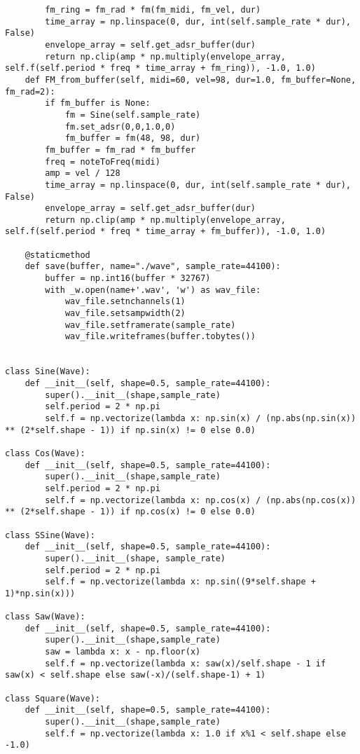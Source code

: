 \documentclass[../main.tex]{subfiles}
\begin{document}
\begin{verbatim}
        fm_ring = fm_rad * fm(fm_midi, fm_vel, dur)
        time_array = np.linspace(0, dur, int(self.sample_rate * dur), False)
        envelope_array = self.get_adsr_buffer(dur)
        return np.clip(amp * np.multiply(envelope_array, self.f(self.period * freq * time_array + fm_ring)), -1.0, 1.0)
    def FM_from_buffer(self, midi=60, vel=98, dur=1.0, fm_buffer=None, fm_rad=2):
        if fm_buffer is None:
            fm = Sine(self.sample_rate)
            fm.set_adsr(0,0,1.0,0)
            fm_buffer = fm(48, 98, dur)
        fm_buffer = fm_rad * fm_buffer
        freq = noteToFreq(midi)
        amp = vel / 128
        time_array = np.linspace(0, dur, int(self.sample_rate * dur), False)
        envelope_array = self.get_adsr_buffer(dur)
        return np.clip(amp * np.multiply(envelope_array, self.f(self.period * freq * time_array + fm_buffer)), -1.0, 1.0)

    @staticmethod
    def save(buffer, name="./wave", sample_rate=44100):
        buffer = np.int16(buffer * 32767)
        with _w.open(name+'.wav', 'w') as wav_file:
            wav_file.setnchannels(1)
            wav_file.setsampwidth(2)
            wav_file.setframerate(sample_rate)
            wav_file.writeframes(buffer.tobytes())

    
class Sine(Wave):
    def __init__(self, shape=0.5, sample_rate=44100):
        super().__init__(shape,sample_rate)
        self.period = 2 * np.pi
        self.f = np.vectorize(lambda x: np.sin(x) / (np.abs(np.sin(x)) ** (2*self.shape - 1)) if np.sin(x) != 0 else 0.0)

class Cos(Wave):
    def __init__(self, shape=0.5, sample_rate=44100):
        super().__init__(shape,sample_rate)
        self.period = 2 * np.pi
        self.f = np.vectorize(lambda x: np.cos(x) / (np.abs(np.cos(x)) ** (2*self.shape - 1)) if np.cos(x) != 0 else 0.0)

class SSine(Wave):
    def __init__(self, shape=0.5, sample_rate=44100):
        super().__init__(shape, sample_rate)
        self.period = 2 * np.pi
        self.f = np.vectorize(lambda x: np.sin((9*self.shape + 1)*np.sin(x)))

class Saw(Wave):
    def __init__(self, shape=0.5, sample_rate=44100):
        super().__init__(shape,sample_rate)
        saw = lambda x: x - np.floor(x)
        self.f = np.vectorize(lambda x: saw(x)/self.shape - 1 if saw(x) < self.shape else saw(-x)/(self.shape-1) + 1)

class Square(Wave):
    def __init__(self, shape=0.5, sample_rate=44100):
        super().__init__(shape,sample_rate)
        self.f = np.vectorize(lambda x: 1.0 if x%1 < self.shape else -1.0)


\end{verbatim}
\end{document}
